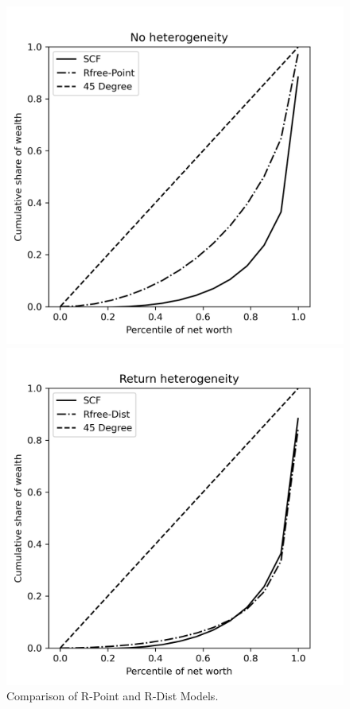 \begin{figure}[h]
    \centering
    \begin{minipage}{0.48\textwidth}
        \centering
        \includegraphics[width=\textwidth]{../Figures/PYrrPointNetWorthPlot.png}
    \end{minipage}
    \hfill
    \begin{minipage}{0.48\textwidth}
        \centering
        \includegraphics[width=\textwidth]{../Figures/PYrrDistNetWorthPlot.png}
    \end{minipage}
    \caption{Comparison of R-Point and R-Dist Models.}
    \label{fig:PYUnif} 
\end{figure}


